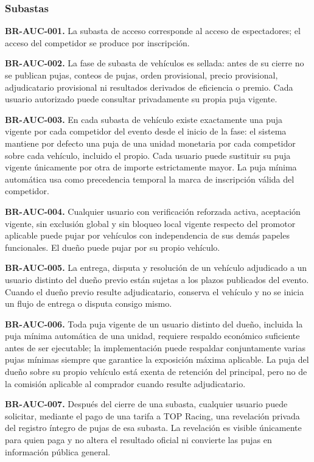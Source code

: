 \documentclass[10pt,letterpaper]{article}
\begin{document}
\subsubsection{Subastas}
\noindent\textbf{BR-AUC-001.} La subasta de acceso corresponde al acceso de espectadores; el acceso del competidor se produce por inscripción.\par
\noindent\textbf{BR-AUC-002.} La fase de subasta de vehículos es sellada: antes de su cierre no se publican pujas, conteos de pujas, orden provisional, precio provisional, adjudicatario provisional ni resultados derivados de eficiencia o premio. Cada usuario autorizado puede consultar privadamente su propia puja vigente.\par
\noindent\textbf{BR-AUC-003.} En cada subasta de vehículo existe exactamente una puja vigente por cada competidor del evento desde el inicio de la fase: el sistema mantiene por defecto una puja de una unidad monetaria por cada competidor sobre cada vehículo, incluido el propio. Cada usuario puede sustituir su puja vigente únicamente por otra de importe estrictamente mayor. La puja mínima automática usa como precedencia temporal la marca de inscripción válida del competidor.\par
\noindent\textbf{BR-AUC-004.} Cualquier usuario con verificación reforzada activa, aceptación vigente, sin exclusión global y sin bloqueo local vigente respecto del promotor aplicable puede pujar por vehículos con independencia de sus demás papeles funcionales. El dueño puede pujar por su propio vehículo.\par
\noindent\textbf{BR-AUC-005.} La entrega, disputa y resolución de un vehículo adjudicado a un usuario distinto del dueño previo están sujetas a los plazos publicados del evento. Cuando el dueño previo resulte adjudicatario, conserva el vehículo y no se inicia un flujo de entrega o disputa consigo mismo.\par
\noindent\textbf{BR-AUC-006.} Toda puja vigente de un usuario distinto del dueño, incluida la puja mínima automática de una unidad, requiere respaldo económico suficiente antes de ser ejecutable; la implementación puede respaldar conjuntamente varias pujas mínimas siempre que garantice la exposición máxima aplicable. La puja del dueño sobre su propio vehículo está exenta de retención del principal, pero no de la comisión aplicable al comprador cuando resulte adjudicatario.\par
\noindent\textbf{BR-AUC-007.} Después del cierre de una subasta, cualquier usuario puede solicitar, mediante el pago de una tarifa a TOP Racing, una revelación privada del registro íntegro de pujas de esa subasta. La revelación es visible únicamente para quien paga y no altera el resultado oficial ni convierte las pujas en información pública general.\par
\end{document}
